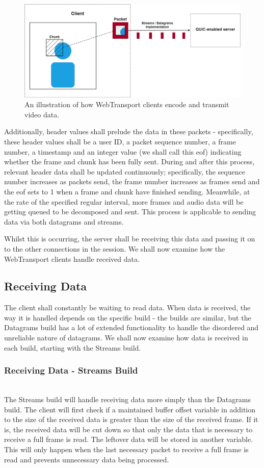\begin{figure}[h]
    \centering
    \includegraphics[width=0.9\linewidth]{images/sending data.png}
	\caption{An illustration of how WebTransport clients encode and transmit video data.}
    \label{wt_sending data}
\end{figure}

Additionally, header values shall prelude the data in these packets - specifically, these header values shall be a user ID, a packet sequence number, a frame number, a timestamp and an integer value (we shall call this eof) indicating whether the frame and chunk has been fully sent. During and after this process, relevant header data shall be updated continuously; specifically, the sequence number increases as packets send, the frame number increases as frames send and the eof sets to 1 when a frame and chunk have finished sending. Meanwhile, at the rate of the specified regular interval, more frames and audio data will be getting queued to be decomposed and sent. This process is applicable to sending data via both datagrams and streams.

Whilst this is occurring, the server shall be receiving this data and passing it on to the other connections in the session. We shall now examine how the WebTransport clients handle received data.

\subsection{Receiving Data}
The client shall constantly be waiting to read data. When data is received, the way it is handled depends on the specific build - the builds are similar, but the Datagrams build has a lot of extended functionality to handle the disordered and unreliable nature of datagrams. We shall now examine how data is received in each build, starting with the Streams build.
\hfill\\
\subsubsection{Receiving Data - Streams Build}
\hfill\\
The Streams build will handle receiving data more simply than the Datagrams build. 
The client will first check if a maintained buffer offset variable in addition to the size of the received data is greater than the size of the received frame. If it is, the received data will be cut down so that only the data that is necessary to receive a full frame is read. The leftover data will be stored in another variable. This will only happen when the last necessary packet to receive a full frame is read and prevents unnecessary data being processed. 

